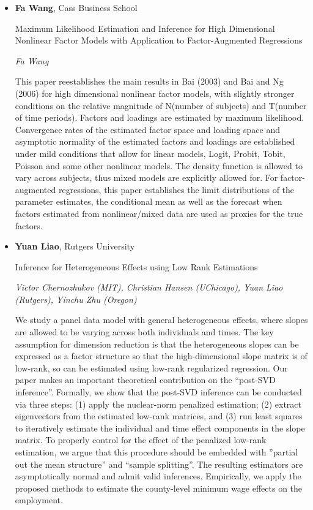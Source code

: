 \begin{itemize}
\item \textbf{Fa Wang}, Cass Business School

Maximum Likelihood Estimation and Inference for High Dimensional Nonlinear Factor Models with Application to Factor-Augmented Regressions

\emph{\footnotesize Fa Wang}

This paper reestablishes the main results in Bai (2003) and Bai and Ng (2006) for high dimensional nonlinear factor models, with slightly stronger conditions on the relative magnitude of N(number of subjects) and T(number of time periods). Factors and loadings are estimated by maximum likelihood. Convergence rates of the estimated factor space and loading space and asymptotic normality of the estimated factors and loadings are established under mild conditions that allow for linear models, Logit, Probit, Tobit, Poisson and some other nonlinear models. The density function is allowed to vary across subjects, thus mixed models are explicitly allowed for. For factor-augmented regressions, this paper establishes the limit distributions of the parameter estimates, the conditional mean as well as the forecast when factors estimated from nonlinear/mixed data are used as proxies for the true factors.

\item \textbf{Yuan Liao}, Rutgers University

Inference for Heterogeneous Effects using Low Rank Estimations

\emph{\footnotesize Victor Chernozhukov (MIT), Christian Hansen (UChicago), Yuan Liao (Rutgers), Yinchu Zhu (Oregon)}

We study a panel data model with general heterogeneous effects, where slopes are allowed to be varying across both individuals and times. The key assumption for dimension reduction is that the heterogeneous slopes can be expressed as a factor structure so that the high-dimensional slope matrix is of low-rank, so can be estimated using low-rank regularized regression. Our paper makes an important theoretical contribution on the ``post-SVD inference''. Formally, we show that the post-SVD inference can be conducted via three steps: (1) apply the nuclear-norm penalized estimation; (2) extract eigenvectors from the estimated low-rank matrices, and (3) run least squares to iteratively estimate the individual and time effect components in the slope matrix. To properly control for the effect of the penalized low-rank estimation, we argue that this procedure should be embedded with ''partial out the mean structure'' and ``sample splitting''. The resulting estimators are asymptotically normal and admit valid inferences. Empirically, we apply the proposed methods to estimate the county-level minimum wage effects on the employment.


\end{itemize}
